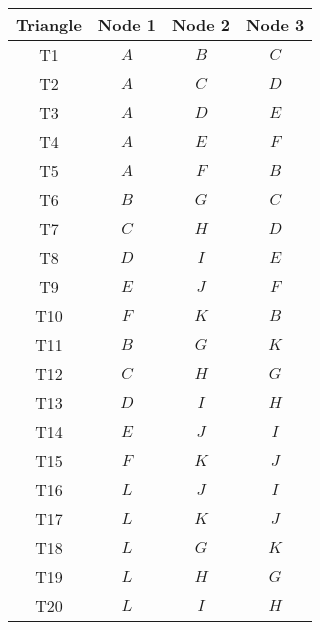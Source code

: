 \documentclass[12pt]{article}
\begin{document}
\begin{center}
\begin{tabular}{| c | c | c | c | }
\hline
Triangle &  Node 1& Node 2 & Node 3  \\
\hline
  T1& $A$ & $B$ & $C$  \\
  T2& $A$ & $C$ & $D$  \\
  T3& $A$ & $D$ & $E$  \\
  T4& $A$ & $E$ & $F$  \\
  T5& $A$ & $F$ & $B$  \\
  T6& $B$ & $G$ & $C$  \\
  T7& $C$ & $H$ & $D$  \\
  T8& $D$ & $I$ & $E$  \\
  T9& $E$ & $J$ & $F$  \\
  T10& $F$ & $K$ & $B$  \\
  T11& $B$ & $G$ & $K$  \\
  T12& $C$ & $H$ & $G$  \\
  T13& $D$ & $I$ & $H$  \\
  T14& $E$ & $J$ & $I$  \\
  T15& $F$ & $K$ & $J$  \\
  T16& $L$ & $J$ & $I$  \\
  T17& $L$ & $K$ & $J$  \\
  T18& $L$ & $G$ & $K$  \\
  T19& $L$ & $H$ & $G$  \\
  T20& $L$ & $I$ & $H$  \\
\hline
\end{tabular}
\end{center}
\end{document}
